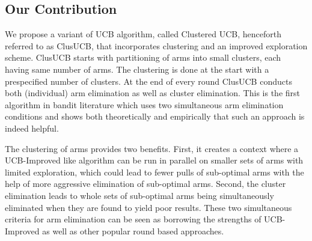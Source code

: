 \vspace*{-0.7em}
\subsection{Our Contribution}
We propose a variant of UCB algorithm, called Clustered UCB, henceforth referred to as ClusUCB, that incorporates clustering and an improved exploration scheme. ClusUCB starts with partitioning of arms into small clusters, each having same number of arms. The clustering is done at the start with a prespecified number of clusters. At the end of every round ClusUCB conducts both (individual) arm elimination as well as cluster elimination. This is the first algorithm in bandit literature which uses two simultaneous arm elimination conditions and shows both theoretically and empirically that such an approach is indeed helpful.



The clustering of arms provides two benefits. First, it creates a context where a UCB-Improved like algorithm can be run in parallel on smaller sets of arms with limited exploration, which could lead to fewer pulls of sub-optimal arms with the help of  more aggressive elimination of sub-optimal arms. Second, the cluster elimination leads to whole sets of sub-optimal arms being simultaneously eliminated when they are found to yield poor results. These two simultaneous criteria for arm elimination can be seen as borrowing the strengths of UCB-Improved as well as other popular round based approaches. 

